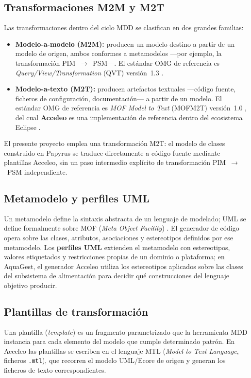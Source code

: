 \documentclass[11pt,a4paper]{article}
\begin{document}
\subsection{Transformaciones M2M y M2T}
Las transformaciones dentro del ciclo MDD se clasifican en dos grandes familias:
\begin{itemize}[nosep]
  \item \textbf{Modelo-a-modelo (M2M):} producen un modelo destino a partir de un modelo de origen,
        ambos conformes a metamodelos —por ejemplo, la transformación PIM~$\rightarrow$~PSM—.
        El estándar OMG de referencia es \textit{Query/View/Transformation} (QVT) versión~1.3
        \cite{omg2016qvt}.
  \item \textbf{Modelo-a-texto (M2T):} producen artefactos textuales —código fuente, ficheros de
        configuración, documentación— a partir de un modelo. El estándar OMG de referencia es
        \textit{MOF Model to Text} (MOFM2T) versión~1.0 \cite{omg2008mofm2t}, del cual
        \textbf{Acceleo} es una implementación de referencia dentro del ecosistema Eclipse
        \cite{eclipseacceleo}.
\end{itemize}
El presente proyecto emplea una transformación M2T: el modelo de clases construido en Papyrus se
traduce directamente a código fuente mediante plantillas Acceleo, sin un paso intermedio explícito de
transformación PIM~$\rightarrow$~PSM independiente.

\subsection{Metamodelo y perfiles UML}
Un metamodelo define la sintaxis abstracta de un lenguaje de modelado; UML se define formalmente
sobre MOF (\textit{Meta Object Facility}) \cite{omg2017uml}. El generador de código opera sobre las
clases, atributos, asociaciones y estereotipos definidos por ese metamodelo. Los \textbf{perfiles UML}
extienden el metamodelo con estereotipos, valores etiquetados y restricciones propias de un dominio o
plataforma; en AquaGest, el generador Acceleo utiliza los estereotipos aplicados sobre las clases del
subsistema de alimentación para decidir qué construcciones del lenguaje objetivo producir.

\subsection{Plantillas de transformación}
Una plantilla (\textit{template}) es un fragmento parametrizado que la herramienta MDD instancia
para cada elemento del modelo que cumple determinado patrón. En Acceleo las plantillas se escriben
en el lenguaje MTL (\textit{Model to Text Language}, ficheros \texttt{.mtl}), que recorren el modelo
UML/Ecore de origen y generan los ficheros de texto correspondientes.
\end{document}
